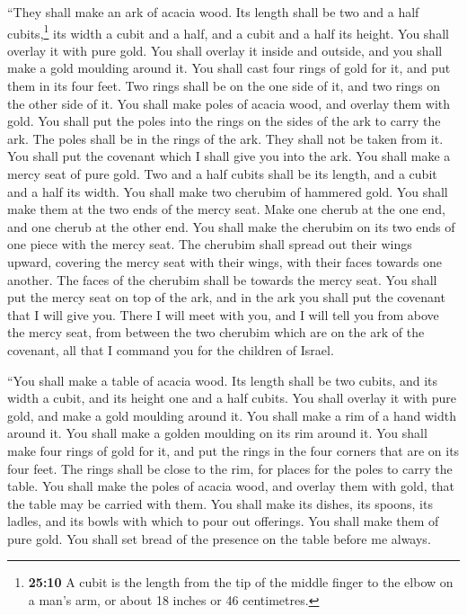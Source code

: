  ``They shall make an ark of acacia wood. Its length
shall be two and a half cubits,\footnote{\textbf{25:10} A cubit is the
  length from the tip of the middle finger to the elbow on a man's arm,
  or about 18 inches or 46 centimetres.} its width a cubit and a half,
and a cubit and a half its height.  You shall overlay it
with pure gold. You shall overlay it inside and outside, and you shall
make a gold moulding around it.  You shall cast four
rings of gold for it, and put them in its four feet. Two rings shall be
on the one side of it, and two rings on the other side of it.
 You shall make poles of acacia wood, and overlay them
with gold.  You shall put the poles into the rings on the
sides of the ark to carry the ark.  The poles shall be in
the rings of the ark. They shall not be taken from it. 
You shall put the covenant which I shall give you into the ark.
 You shall make a mercy seat of pure gold. Two and a half
cubits shall be its length, and a cubit and a half its width.
 You shall make two cherubim of hammered gold. You shall
make them at the two ends of the mercy seat.  Make one
cherub at the one end, and one cherub at the other end. You shall make
the cherubim on its two ends of one piece with the mercy seat.
 The cherubim shall spread out their wings upward,
covering the mercy seat with their wings, with their faces towards one
another. The faces of the cherubim shall be towards the mercy seat.
 You shall put the mercy seat on top of the ark, and in
the ark you shall put the covenant that I will give you. 
There I will meet with you, and I will tell you from above the mercy
seat, from between the two cherubim which are on the ark of the
covenant, all that I command you for the children of Israel.

 ``You shall make a table of acacia wood. Its length
shall be two cubits, and its width a cubit, and its height one and a
half cubits.  You shall overlay it with pure gold, and
make a gold moulding around it.  You shall make a rim of
a hand width around it. You shall make a golden moulding on its rim
around it.  You shall make four rings of gold for it, and
put the rings in the four corners that are on its four feet.
 The rings shall be close to the rim, for places for the
poles to carry the table.  You shall make the poles of
acacia wood, and overlay them with gold, that the table may be carried
with them.  You shall make its dishes, its spoons, its
ladles, and its bowls with which to pour out offerings. You shall make
them of pure gold.  You shall set bread of the presence
on the table before me always.

